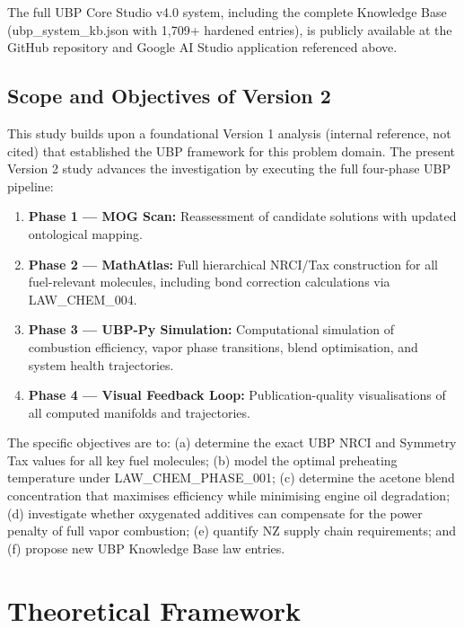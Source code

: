 \documentclass[12pt,a4paper]{article}
\begin{document}
The full UBP Core Studio v4.0 system, including the complete Knowledge Base
(ubp\_system\_kb.json with 1,709+ hardened entries), is publicly available at the
GitHub repository and Google AI Studio application referenced above.

\subsection{Scope and Objectives of Version 2}

This study builds upon a foundational Version 1 analysis (internal reference, not
cited) that established the UBP framework for this problem domain. The present Version
2 study advances the investigation by executing the full four-phase UBP pipeline:

\begin{enumerate}
  \item \textbf{Phase 1 --- MOG Scan:} Reassessment of candidate solutions with
  updated ontological mapping.
  \item \textbf{Phase 2 --- MathAtlas:} Full hierarchical NRCI/Tax construction for
  all fuel-relevant molecules, including bond correction calculations via
  LAW\_CHEM\_004.
  \item \textbf{Phase 3 --- UBP-Py Simulation:} Computational simulation of combustion
  efficiency, vapor phase transitions, blend optimisation, and system health
  trajectories.
  \item \textbf{Phase 4 --- Visual Feedback Loop:} Publication-quality visualisations
  of all computed manifolds and trajectories.
\end{enumerate}

The specific objectives are to: (a) determine the exact UBP NRCI and Symmetry Tax
values for all key fuel molecules; (b) model the optimal preheating temperature under
LAW\_CHEM\_PHASE\_001; (c) determine the acetone blend concentration that maximises
efficiency while minimising engine oil degradation; (d) investigate whether oxygenated
additives can compensate for the power penalty of full vapor combustion; (e) quantify
NZ supply chain requirements; and (f) propose new UBP Knowledge Base law entries.

\newpage

\section{Theoretical Framework}
\end{document}
